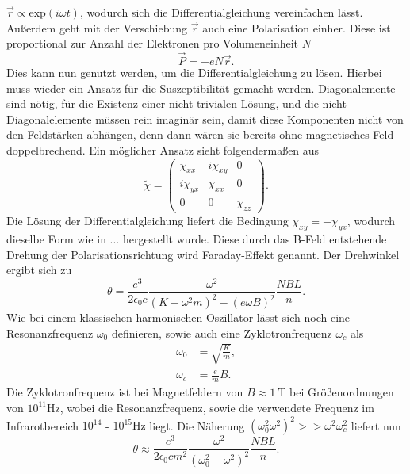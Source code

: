 $\vec{r} \propto \text{exp}(i\omega t)$, wodurch sich die Differentialgleichung vereinfachen lässt.
Außerdem geht mit der Verschiebung $\vec{r}$ auch eine Polarisation einher. Diese ist proportional zur Anzahl der Elektronen pro Volumeneinheit $N$
\begin{equation}
\vec{P} = - e N\vec{r}.
\end{equation}
Dies kann nun genutzt werden, um die Differentialgleichung zu lösen. Hierbei muss wieder ein Ansatz für die Suszeptibilität gemacht werden. Diagonalemente sind nötig, für die Existenz
einer nicht-trivialen Lösung, und die nicht Diagonalelemente müssen rein imaginär sein, damit diese Komponenten nicht von den Feldstärken abhängen, denn dann wären sie bereits ohne 
magnetisches Feld doppelbrechend.
Ein möglicher Ansatz sieht folgendermaßen aus 
\begin{equation}
    \tilde{\chi} = \begin{pmatrix}
        \chi_{xx} & i\chi_{xy} & 0 \\
        i\chi_{yx} & \chi_{xx} & 0 \\
        0 & 0 & \chi_{zz}
        \end{pmatrix}.
\end{equation}
Die Lösung der Differentialgleichung liefert die Bedingung $\chi_{xy} = -\chi_{yx}$, wodurch dieselbe Form wie in ... hergestellt wurde.
Diese durch das B-Feld entstehende Drehung der Polarisationsrichtung wird Faraday-Effekt genannt.
Der Drehwinkel ergibt sich zu
\begin{equation}
\theta = \frac{e^3}{2 \epsilon_0 c} \frac{\omega^2}{(K - \omega^2 m)^2 - (e\omega B)^2} \frac{NBL}{n}.
\end{equation}
Wie bei einem klassischen harmonischen Oszillator lässt sich noch eine Resonanzfrequenz $\omega_0$ definieren, sowie auch eine Zyklotronfrequenz $\omega_c$ als
\begin{align}
\omega_0 &= \sqrt{\frac{K}{m}}, \\
\omega_c &= \frac{e}{m}B.
\end{align}
Die Zyklotronfrequenz ist bei Magnetfeldern von $B \approx \SI{1}{\tesla}$ bei Größenordnungen von $10^{11}\si{\hertz}$, wobei die Resonanzfrequenz, sowie die verwendete Frequenz im
Infrarotbereich $10^{14}$ - $10^{15}\si{\hertz}$ liegt. Die Näherung $(\omega^2_0 \omega^2)^2 >> \omega^2\omega^2_c$ liefert nun
\begin{equation*}
    \theta \approx \frac{e^3}{2 \epsilon_0 c m^2} \frac{\omega^2}{(\omega^2_0 -\omega^2)^2} \frac{NBL}{n}.
\end{equation*}
